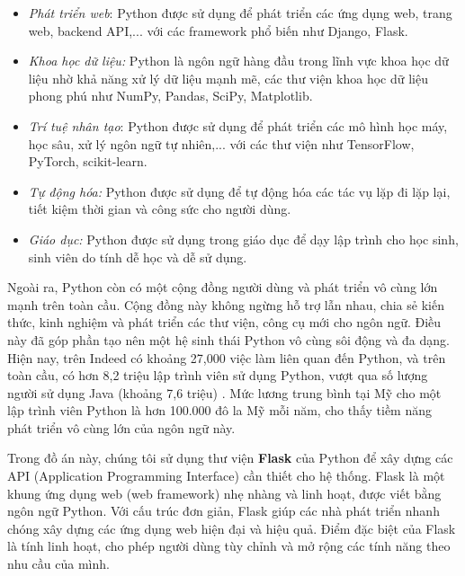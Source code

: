 \begin{itemize}
        \begin{itemize}
            \item \textit{Phát triển web}: Python được sử dụng để phát triển các ứng dụng web, trang web, backend API,... với các framework phổ biến như Django, Flask.
            \item \textit{Khoa học dữ liệu:} Python là ngôn ngữ hàng đầu trong lĩnh vực khoa học dữ liệu nhờ khả năng xử lý dữ liệu mạnh mẽ, các thư viện khoa học dữ liệu phong phú như NumPy, Pandas, SciPy, Matplotlib.
            \item \textit{Trí tuệ nhân tạo}: Python được sử dụng để phát triển các mô hình học máy, học sâu, xử lý ngôn ngữ tự nhiên,... với các thư viện như TensorFlow, PyTorch, scikit-learn.
            \item \textit{Tự động hóa:} Python được sử dụng để tự động hóa các tác vụ lặp đi lặp lại, tiết kiệm thời gian và công sức cho người dùng.
            \item \textit{Giáo dục: }Python được sử dụng trong giáo dục để dạy lập trình cho học sinh, sinh viên do tính dễ học và dễ sử dụng.
        \end{itemize}
\end{itemize}

Ngoài ra, Python còn có một cộng đồng người dùng và phát triển vô cùng lớn mạnh trên toàn cầu. Cộng đồng này không ngừng hỗ trợ lẫn nhau, chia sẻ kiến thức, kinh nghiệm và phát triển các thư viện, công cụ mới cho ngôn ngữ. Điều này đã góp phần tạo nên một hệ sinh thái Python vô cùng sôi động và đa dạng. Hiện nay, trên Indeed có khoảng 27,000 việc làm liên quan đến Python, và trên toàn cầu, có hơn 8,2 triệu lập trình viên sử dụng Python, vượt qua số lượng người sử dụng Java (khoảng 7,6 triệu) \cite{zdnet}. Mức lương trung bình tại Mỹ cho một lập trình viên Python là hơn 100.000 đô la Mỹ mỗi năm, cho thấy tiềm năng phát triển vô cùng lớn của ngôn ngữ này.

Trong đồ án này, chúng tôi sử dụng thư viện \textbf{Flask} của Python để xây dựng các API (Application Programming Interface) cần thiết cho hệ thống. Flask là một khung ứng dụng web (web framework) nhẹ nhàng và linh hoạt, được viết bằng ngôn ngữ Python. Với cấu trúc đơn giản, Flask giúp các nhà phát triển nhanh chóng xây dựng các ứng dụng web hiện đại và hiệu quả. Điểm đặc biệt của Flask là tính linh hoạt, cho phép người dùng tùy chỉnh và mở rộng các tính năng theo nhu cầu của mình.

